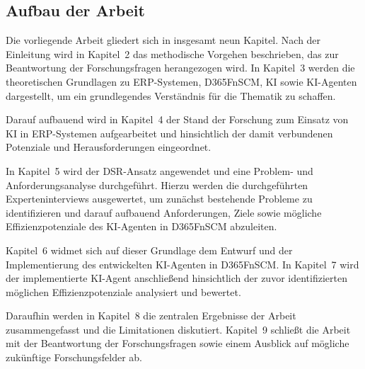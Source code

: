\subsection{Aufbau der Arbeit}

Die vorliegende Arbeit gliedert sich in insgesamt neun Kapitel. Nach der Einleitung wird in Kapitel~2 das methodische Vorgehen beschrieben, das zur Beantwortung der Forschungsfragen herangezogen wird. In Kapitel~3 werden die theoretischen Grundlagen zu \ac{ERP}-Systemen, \ac{D365FnSCM}, \ac{KI} sowie \ac{KI}-Agenten dargestellt, um ein grundlegendes Verständnis für die Thematik zu schaffen.

Darauf aufbauend wird in Kapitel~4 der Stand der Forschung zum Einsatz von \ac{KI} in \ac{ERP}-Systemen aufgearbeitet und hinsichtlich der damit verbundenen Potenziale und Herausforderungen eingeordnet. 

In Kapitel~5 wird der \ac{DSR}-Ansatz angewendet und eine Problem- und Anforderungsanalyse durchgeführt. Hierzu werden die durchgeführten Experteninterviews ausgewertet, um zunächst bestehende Probleme zu identifizieren und darauf aufbauend Anforderungen, Ziele sowie mögliche Effizienzpotenziale des \ac{KI}-Agenten in \ac{D365FnSCM} abzuleiten.

Kapitel~6 widmet sich auf dieser Grundlage dem Entwurf und der Implementierung des entwickelten \ac{KI}-Agenten in \ac{D365FnSCM}. In Kapitel~7 wird der implementierte \ac{KI}-Agent anschließend hinsichtlich der zuvor identifizierten möglichen Effizienzpotenziale analysiert und bewertet.

Daraufhin werden in Kapitel~8 die zentralen Ergebnisse der Arbeit zusammengefasst und die Limitationen diskutiert. Kapitel~9 schließt die Arbeit mit der Beantwortung der Forschungsfragen sowie einem Ausblick auf mögliche zukünftige Forschungsfelder ab.
